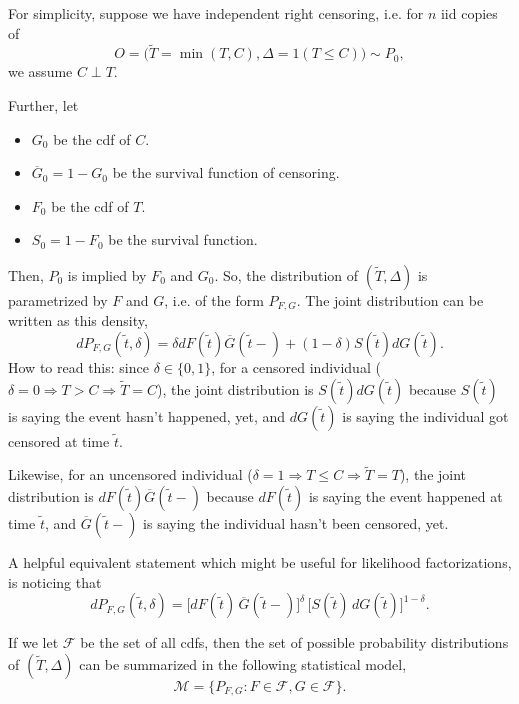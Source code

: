 \documentclass[12pt]{article}
\DeclareMathOperator{\1}{\mathds{1}}
\begin{document}
\hfill

For simplicity, suppose we have independent right censoring, i.e. for $n$ iid copies of 
\[
O = \big(\widetilde T = \min(T, C), \Delta = 1(T \le C)\big) \sim P_0,
\]
we assume $C \perp T$. 

\hfill

Further, let 
\begin{itemize}
	\item $G_0$ be the cdf of $C$.
	\item $\overline G_0 = 1 - G_0$ be the survival function of censoring.  
	\item $F_0$ be the cdf of $T$.
	\item $S_0 = 1 - F_0$ be the survival function.
\end{itemize}
Then, $P_0$ is implied by $F_0$ and $G_0$. So, the distribution of $(\widetilde T, \Delta)$ is parametrized by $F$ and $G$, i.e. of the form $P_{F, G}$. The joint distribution can be written as this density, 
\[
dP_{F, G}(\tilde t, \delta) = \delta dF(\tilde t) \overline G(\tilde t -) + (1 - \delta) S(\tilde t)dG(\tilde t).
\]
How to read this: since $\delta \in \{0, 1\}$, for a censored individual ($\delta = 0 \Rightarrow T > C \Rightarrow \widetilde T = C$), the joint distribution is $S(\tilde t) dG(\tilde t)$ because $S(\tilde t)$ is saying the event hasn't happened, yet, and $dG(\tilde t)$ is saying the individual got censored at time $\tilde t$. 

\hfill

Likewise, for an uncensored individual ($\delta = 1 \Rightarrow T \le C \Rightarrow \widetilde T = T$), the joint distribution is $dF(\tilde t) \overline G(\tilde t-)$ because $dF(\tilde t)$ is saying the event happened at time $\tilde t$, and $\overline G(\tilde t-)$ is saying the individual hasn't been censored, yet. 

\hfill

A helpful equivalent statement which might be useful for likelihood factorizations, is noticing that 
\[
dP_{F, G}(\tilde t, \delta) = \big[dF(\tilde t)\,\overline G(\tilde t-)\big]^{\delta}\,\big[S(\tilde t)\,dG(\tilde t)\big]^{1-\delta}.
\]

\hfill

If we let $\mathcal F$ be the set of all cdfs, then the set of possible probability distributions of $(\widetilde T, \Delta)$ can be summarized in the following statistical model,
\[
\mathcal M = \{P_{F, G}: F \in \mathcal F, G \in \mathcal F\}.
\]
\end{document}
